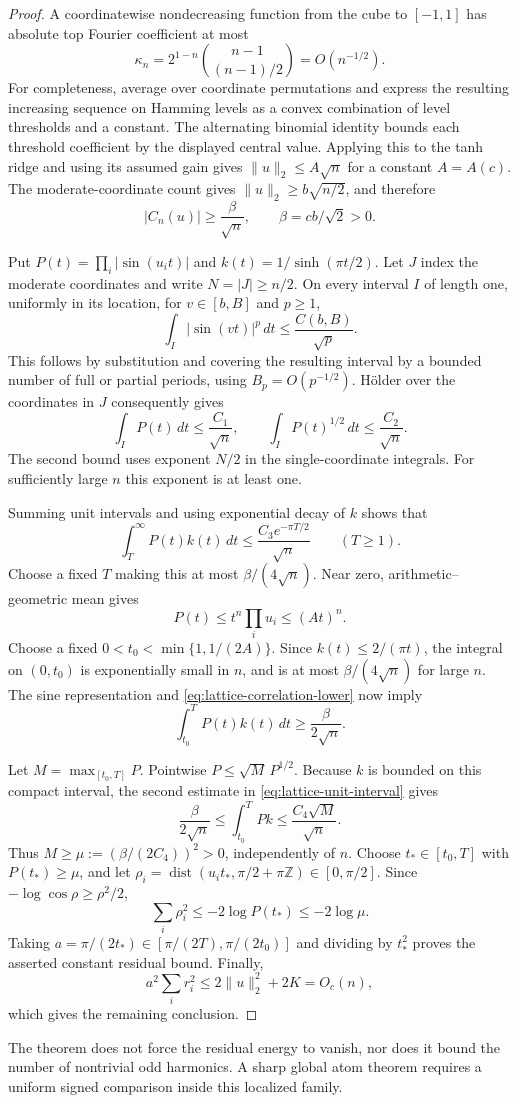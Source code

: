 \begin{proof}
A coordinatewise nondecreasing function from the cube to $[-1,1]$ has
absolute top Fourier coefficient at most
\[
 \kappa_n=2^{1-n}\binom{n-1}{(n-1)/2}=O(n^{-1/2}).
\]
For completeness, average over coordinate permutations and express the
resulting increasing sequence on Hamming levels as a convex combination
of level thresholds and a constant. The alternating binomial identity
bounds each threshold coefficient by the displayed central value.
Applying this to the tanh ridge and using its assumed gain gives
$\|u\|_2\le A\sqrt n$ for a constant $A=A(c)$. The moderate-coordinate
count gives $\|u\|_2\ge b\sqrt{n/2}$, and therefore
\begin{equation}\label{eq:lattice-correlation-lower}
 |C_n(u)|\ge\frac\beta{\sqrt n},\qquad \beta=cb/\sqrt2>0.
\end{equation}

Put $P(t)=\prod_i|\sin(u_it)|$ and $k(t)=1/\sinh(\pi t/2)$.
Let $J$ index the moderate coordinates and write $N=|J|\ge n/2$.
On every interval $I$ of length one, uniformly in its location, for
$v\in[b,B]$ and $p\ge1$,
\[
 \int_I|\sin(vt)|^p\,dt\le\frac{C(b,B)}{\sqrt p}.
\]
This follows by substitution and covering the resulting interval by a
bounded number of full or partial periods, using $B_p=O(p^{-1/2})$.
H\"older over the coordinates in $J$ consequently gives
\begin{equation}\label{eq:lattice-unit-interval}
 \int_I P(t)\,dt\le\frac{C_1}{\sqrt n},\qquad
 \int_I P(t)^{1/2}\,dt\le\frac{C_2}{\sqrt n}.
\end{equation}
The second bound uses exponent $N/2$ in the single-coordinate integrals.
For sufficiently large $n$ this exponent is at least one.

Summing unit intervals and using exponential decay of $k$ shows that
\[
 \int_T^\infty P(t)k(t)\,dt
 \le\frac{C_3e^{-\pi T/2}}{\sqrt n}\qquad(T\ge1).
\]
Choose a fixed $T$ making this at most $\beta/(4\sqrt n)$.
Near zero, arithmetic--geometric mean gives
\[
 P(t)\le t^n\prod_i u_i\le(At)^n.
\]
Choose a fixed $0<t_0<\min\{1,1/(2A)\}$. Since $k(t)\le2/(\pi t)$,
the integral on $(0,t_0)$ is exponentially small in $n$, and is at most
$\beta/(4\sqrt n)$ for large $n$. The sine representation and
\eqref{eq:lattice-correlation-lower} now imply
\[
 \int_{t_0}^T P(t)k(t)\,dt\ge\frac\beta{2\sqrt n}.
\]

Let $M=\max_{[t_0,T]}P$. Pointwise $P\le\sqrt M\,P^{1/2}$.
Because $k$ is bounded on this compact interval, the second estimate in
\eqref{eq:lattice-unit-interval} gives
\[
 \frac\beta{2\sqrt n}
 \le\int_{t_0}^T Pk\le\frac{C_4\sqrt M}{\sqrt n}.
\]
Thus $M\ge\mu:=(\beta/(2C_4))^2>0$, independently of $n$.
Choose $t_*\in[t_0,T]$ with $P(t_*)\ge\mu$, and let
$\rho_i=\operatorname{dist}(u_it_*,\pi/2+\pi\mathbb Z)\in[0,\pi/2]$.
Since $-\log\cos\rho\ge\rho^2/2$,
\[
 \sum_i\rho_i^2\le-2\log P(t_*)\le-2\log\mu.
\]
Taking $a=\pi/(2t_*)\in[\pi/(2T),\pi/(2t_0)]$ and dividing by
$t_*^2$ proves the asserted constant residual bound. Finally,
\[
 a^2\sum_i r_i^2\le2\|u\|_2^2+2K=O_c(n),
\]
which gives the remaining conclusion.
\end{proof}

The theorem does not force the residual energy to vanish, nor does it
bound the number of nontrivial odd harmonics. A sharp global atom theorem
requires a uniform signed comparison inside this localized family.
